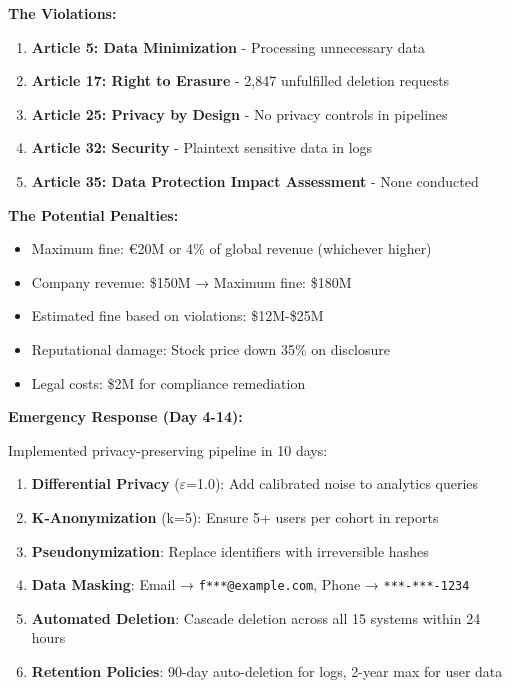 \textbf{The Violations:}

\begin{enumerate}
    \item \textbf{Article 5: Data Minimization} - Processing unnecessary data
    \item \textbf{Article 17: Right to Erasure} - 2,847 unfulfilled deletion requests
    \item \textbf{Article 25: Privacy by Design} - No privacy controls in pipelines
    \item \textbf{Article 32: Security} - Plaintext sensitive data in logs
    \item \textbf{Article 35: Data Protection Impact Assessment} - None conducted
\end{enumerate}

\textbf{The Potential Penalties:}

\begin{itemize}
    \item Maximum fine: €20M or 4\% of global revenue (whichever higher)
    \item Company revenue: \$150M → Maximum fine: \$180M
    \item Estimated fine based on violations: \$12M-\$25M
    \item Reputational damage: Stock price down 35\% on disclosure
    \item Legal costs: \$2M for compliance remediation
\end{itemize}

\textbf{Emergency Response (Day 4-14):}

Implemented privacy-preserving pipeline in 10 days:

\begin{enumerate}
    \item \textbf{Differential Privacy} (\ensuremath{\varepsilon}=1.0): Add calibrated noise to analytics queries
    \item \textbf{K-Anonymization} (k=5): Ensure 5+ users per cohort in reports
    \item \textbf{Pseudonymization}: Replace identifiers with irreversible hashes
    \item \textbf{Data Masking}: Email → \texttt{f***@example.com}, Phone → \texttt{***-***-1234}
    \item \textbf{Automated Deletion}: Cascade deletion across all 15 systems within 24 hours
    \item \textbf{Retention Policies}: 90-day auto-deletion for logs, 2-year max for user data
\end{enumerate}

